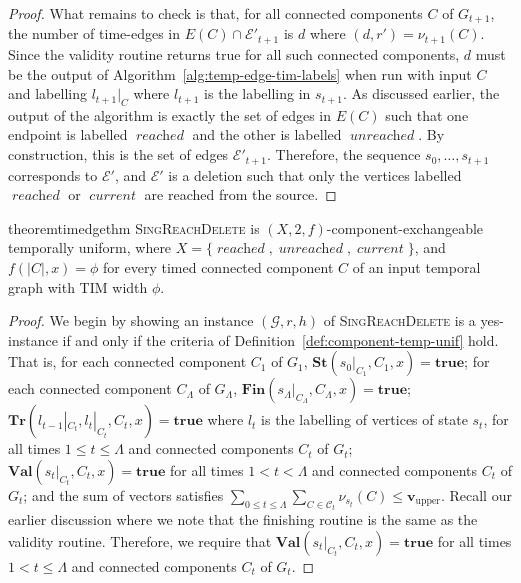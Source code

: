 \documentclass[a4paper,UKenglish,cleveref, autoref, thm-restate]{lipics-v2021} %
\DeclareMathOperator{\reached}{\textit{reached}}
\DeclareMathOperator{\unreached}{\textit{unreached}}
\DeclareMathOperator{\current}{\textit{current}}
\begin{document}
\begin{toappendix}
\begin{proof}
    What remains to check is that, for all connected components $C$ of $G_{t+1}$, the number of time-edges in $E(C)\cap \mathcal{E}'_{t+1}$ is $d$ where $(d,r')=\nu_{t+1}(C)$. Since the validity routine returns true for all such connected components, $d$ must be the output of Algorithm~\ref{alg:temp-edge-tim-labels} when run with input $C$ and labelling $l_{t+1}|_C$ where $l_{t+1}$ is the labelling in $s_{t+1}$. As discussed earlier, the output of the algorithm is exactly the set of edges in $E(C)$ such that one endpoint is labelled $\reached$ and the other is labelled $\unreached$. By construction, this is the set of edges $\mathcal{E}'_{t+1}$. Therefore, the sequence $s_0,\ldots,s_{t+1}$ corresponds to $\mathcal{E}'$, and $\mathcal{E}'$ is a deletion such that only the vertices labelled $\reached$ or $\current$ are reached from the source.
\end{proof}
\begin{restatable}{theorem}{timedgethm}
    \textsc{SingReachDelete} is $(X,2,f)$-component-exchangeable temporally uniform, where $X=\{\reached,\unreached,\current\}$, and $f(|C|,x)=\phi$ for every timed connected component $C$ of an input temporal graph with TIM width $\phi$.
\end{restatable}
\begin{proof}
    We begin by showing an instance $(\mathcal{G},r,h)$ of \textsc{SingReachDelete} is a yes-instance if and only if the criteria of Definition~\ref{def:component-temp-unif} hold.  That is, for each connected component $C_1$ of $G_1$, $\textbf{St}(s_0|_{C_1},C_1,x)=\textbf{true}$; for each connected component $C_{\Lambda}$ of $G_{\Lambda}$, $\textbf{Fin}(s_{\Lambda}|_{C_{\Lambda}},C_{\Lambda},x)=\textbf{true}$; $\textbf{Tr}(l_{t-1}|_{C_t}, l_t|_{C_t}, C_t,x)=\textbf{true}$ where $l_t$ is the labelling of vertices of state $s_t$, for all times $1 \leq t \leq \Lambda$ and connected components $C_t$ of $G_t$; $\textbf{Val}(s_t|_{C_t}, C_t,x)=\textbf{true}$ for all times $1 < t < \Lambda$ and connected components $C_t$ of $G_t$; and the sum of vectors satisfies $\sum_{0\leq t\leq \Lambda} \sum_{C \in\mathcal{C}_t}\nu_{s_t} (C)\leq \textbf{v}_{\text{upper}}$. Recall our earlier discussion where we note that the finishing routine is the same as the validity routine. Therefore, we require that $\textbf{Val}(s_t|_{C_t}, C_t,x)=\textbf{true}$ for all times $1 < t \leq \Lambda$ and connected components $C_t$ of $G_t$.


\end{proof}
\end{toappendix}
\end{document}
